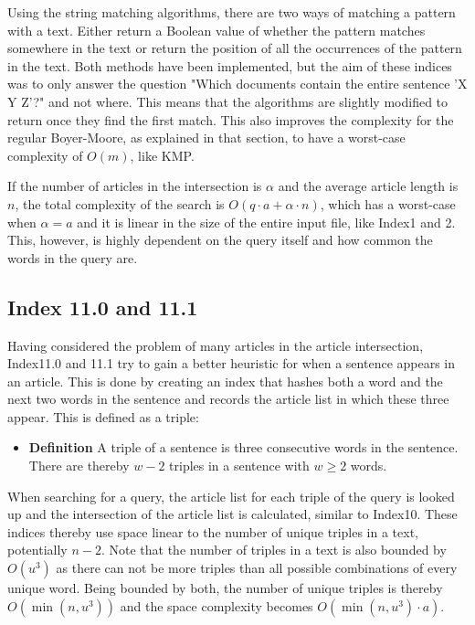 Using the string matching algorithms, there are two ways of matching a pattern with a text. Either return a Boolean value of whether the pattern matches somewhere in the text or return the position of all the occurrences of the pattern in the text. Both methods have been implemented, but the aim of these indices was to only answer the question "Which documents contain the entire sentence 'X Y Z'?" and not where. This means that the algorithms are slightly modified to return once they find the first match. This also improves the complexity for the regular Boyer-Moore, as explained in that section, to have a worst-case complexity of $O(m)$, like KMP. 

If the number of articles in the intersection is $\alpha$ and the average article length is $n$, the total complexity of the search is $O(q\cdot a+\alpha\cdot n)$, which has a worst-case when $\alpha=a$ and it is linear in the size of the entire input file, like Index1 and 2. This, however, is highly dependent on the query itself and how common the words in the query are. 

\subsection{Index 11.0 and 11.1}
Having considered the problem of many articles in the article intersection, Index11.0 and 11.1 try to gain a better heuristic for when a sentence appears in an article. This is done by creating an index that hashes both a word and the next two words in the sentence and records the article list in which these three appear. This is defined as a triple:

\begin{itemize}
    \item[] \textbf{Definition} A triple of a sentence is three consecutive words in the sentence. \\There are thereby $w-2$ triples in a sentence with $w\geq2$ words.
\end{itemize}

When searching for a query, the article list for each triple of the query is looked up and the intersection of the article list is calculated, similar to Index10. These indices thereby use space linear to the number of unique triples in a text, potentially $n-2$. Note that the number of triples in a text is also bounded by $O(u^3)$ as there can not be more triples than all possible combinations of every unique word. Being bounded by both, the number of unique triples is thereby $O(\min(n,u^3))$ and the space complexity becomes $O(\min(n,u^3)\cdot a)$. 

